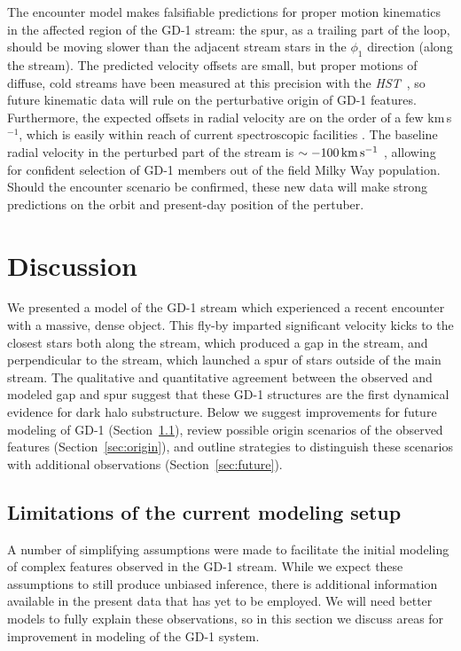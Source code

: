 \documentclass[twocolumn]{aastex62}
\newcommand{\hst}{\textsl{HST}}
\begin{document}
The encounter model makes falsifiable predictions for proper motion kinematics in the affected region of the GD-1 stream: the spur, as a trailing part of the loop, should be moving slower than the adjacent stream stars in the $\phi_1$ direction (along the stream).
The predicted velocity offsets are small, but proper motions of diffuse, cold streams have been measured at this precision with the \hst\ \citep{sohn2016}, so future kinematic data will rule on the perturbative origin of GD-1 features.
Furthermore, the expected offsets in radial velocity are on the order of a few km\,s$^{-1}$, which is easily within reach of current spectroscopic facilities \citep[e.g.,][]{sg2007}.
The baseline radial velocity in the perturbed part of the stream is $\sim-100\,\rm km\,s^{-1}$ \citep{koposov2010}, allowing for confident selection of GD-1 members out of the field Milky Way population.
Should the encounter scenario be confirmed, these new data will make strong predictions on the orbit and present-day position of the pertuber.


\section{Discussion}
\label{sec:discussion}
We presented a model of the GD-1 stream which experienced a recent encounter with a massive, dense object.
This fly-by imparted significant velocity kicks to the closest stars both along the stream, which produced a gap in the stream, and perpendicular to the stream, which launched a spur of stars outside of the main stream.
The qualitative and quantitative agreement between the observed and modeled gap and spur suggest that these GD-1 structures are the first dynamical evidence for dark halo substructure.
Below we suggest improvements for future modeling of GD-1 (Section~\ref{sec:caveats}), review possible origin scenarios of the observed features (Section~\ref{sec:origin}), and outline strategies to distinguish these scenarios with additional observations (Section~\ref{sec:future}).

\subsection{Limitations of the current modeling setup}
\label{sec:caveats}
A number of simplifying assumptions were made to facilitate the initial modeling of complex features observed in the GD-1 stream.
While we expect these assumptions to still produce unbiased inference, there is additional information available in the present data that has yet to be employed.
We will need better models to fully explain these observations, so in this section we discuss areas for improvement in modeling of the GD-1 system.
\end{document}

